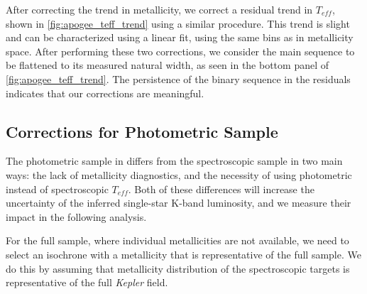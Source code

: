 \documentclass[manuscript]{aastex6}
\newcommand{\Kepler}{\mbox{\textit{Kepler}}}
\newcommand{\Teff}{\ensuremath{T_{eff}}}
\begin{document}
After correcting the trend in metallicity, we correct a residual trend in
\Teff{}, shown in \cref{fig:apogee_teff_trend} using a similar procedure. This 
trend is slight and can be characterized using a linear fit, using the same 
bins as in metallicity space. After performing these two corrections, we 
consider the main sequence to be flattened to its measured natural width, as
seen in the bottom panel of \cref{fig:apogee_teff_trend}. The persistence of 
the binary sequence in the residuals indicates that our corrections are 
meaningful.  

\subsection{Corrections for Photometric Sample}

The photometric sample in \citet{McQuillan14} differs from the spectroscopic
sample in two main ways: the lack of metallicity diagnostics, and the necessity
of using photometric instead of spectroscopic \Teff{}. Both of these
differences will increase the uncertainty of the inferred single-star K-band
luminosity, and we measure their impact in the following analysis.

For the full \citet{McQuillan14} sample, where individual metallicities are not
available, we need to select an isochrone with a metallicity that is 
representative of the full sample. We do this by assuming that metallicity 
distribution of the spectroscopic targets is representative of the full 
\Kepler{} field. 

\begin{figure*}[htb]
    \centering
    \caption{\emph{Left:} Metallicity distribution of the \Kepler{} cool 
        dwarfs, selected as having \(\Teff < 5250 \textrm{ K }\) and having 
        a luminosity less than 1.3 mag above the single-star sequence. The 
        thick black line denotes the median while the thin black lines denote 
        the \(1\sigma\) confidence intervals. \emph{Right:} The vertical 
        displacement caused by assuming a single metallicity isochrone. The
blue line represents the vertical displacement imposed by a metallicity 
mismatches compared to a [Fe/H] = 0.8 dex isochrone for a 5000 K star as 
predicted by the MIST isochrones. The red line denotes the vertical 
displacement caused by metallicity mismatches after correcting for the 
metallicity-dependent offset of the main sequence relative to the MIST 
isochrones shown in \cref{fig:met_trend}.}\label{fig:metallicity}
\end{figure*}
\end{document}
